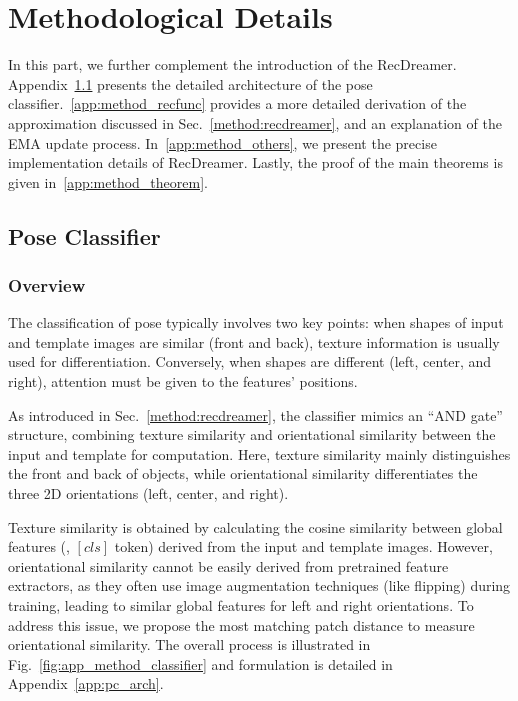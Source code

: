 


\section{Methodological Details}\label{app:method}


In this part, we further complement the introduction of the RecDreamer. Appendix~\ref{app:method_classifier} presents the detailed architecture of the pose classifier.~\ref{app:method_recfunc} provides a more detailed derivation of the approximation discussed in Sec.~\ref{method:recdreamer}, and an explanation of the EMA update process. In~\ref{app:method_others}, we present the precise implementation details of RecDreamer. Lastly, the proof of the main theorems is given in~\ref{app:method_theorem}.



\subsection{Pose Classifier}\label{app:method_classifier}
\subsubsection{Overview}
The classification of pose typically involves two key points: when shapes of input and template images are similar (front and back), texture information is usually used for differentiation. Conversely, when shapes are different (left, center, and right), attention must be given to the features' positions. 

As introduced in Sec.~\ref{method:recdreamer}, the classifier mimics an ``AND gate'' structure, combining texture similarity and orientational similarity between the input and template for computation. Here, texture similarity mainly distinguishes the front and back of objects, while orientational similarity differentiates the three 2D orientations (left, center, and right). 

Texture similarity is obtained by calculating the cosine similarity between global features (\ie, $[cls]$ token) derived from the input and template images. However, orientational similarity cannot be easily derived from pretrained feature extractors, as they often use image augmentation techniques (like flipping) during training, leading to similar global features for left and right orientations. To address this issue, we propose the most matching patch distance to measure orientational similarity. The overall process is illustrated in Fig.~\ref{fig:app_method_classifier} and formulation is detailed in Appendix~\ref{app:pc_arch}.


